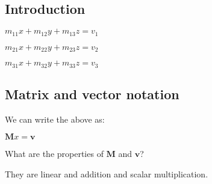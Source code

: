 
\subsection{Introduction}

\(m_{11}x+m_{12}y+m_{13}z=v_1\)

\(m_{21}x+m_{22}y+m_{23}z=v_2\)

\(m_{31}x+m_{32}y+m_{33}z=v_3\)


\subsection{Matrix and vector notation}

We can write the above as:

\(\mathbf{M}x=\mathbf{v}\)

What are the properties of \(\mathbf{M}\) and \(\mathbf{v}\)?

They are linear and addition and scalar multiplication.
